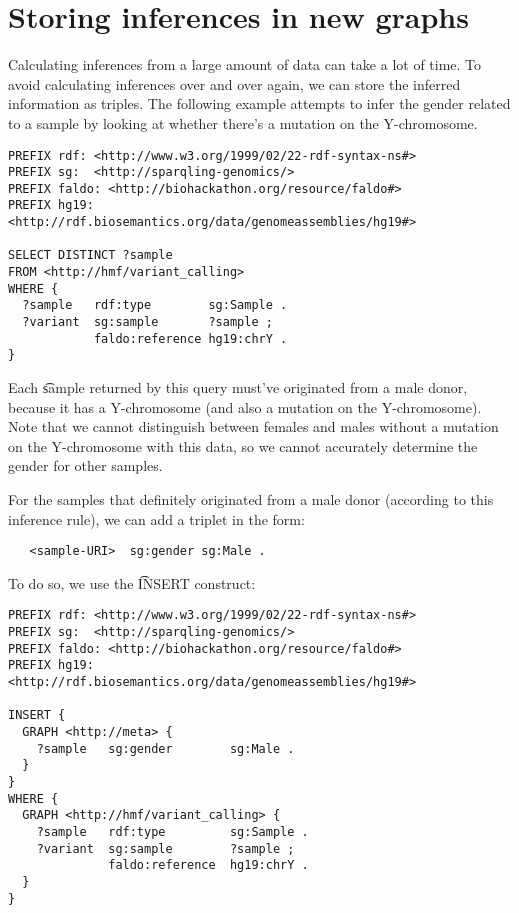 \section{Storing inferences in new graphs}
\label{sec:storing-inferences-in-new-graphs}

  Calculating inferences from a large amount of data can take a lot of time.
  To avoid calculating inferences over and over again, we can store the
  inferred information as triples.  The following example attempts to infer
  the gender related to a sample by looking at whether there's a mutation on
  the Y-chromosome.

\begin{siderules}
\begin{verbatim}
PREFIX rdf: <http://www.w3.org/1999/02/22-rdf-syntax-ns#>
PREFIX sg:  <http://sparqling-genomics/>
PREFIX faldo: <http://biohackathon.org/resource/faldo#>
PREFIX hg19:  <http://rdf.biosemantics.org/data/genomeassemblies/hg19#>

SELECT DISTINCT ?sample
FROM <http://hmf/variant_calling>
WHERE {
  ?sample   rdf:type        sg:Sample .
  ?variant  sg:sample       ?sample ;
            faldo:reference hg19:chrY .
}
\end{verbatim}
\end{siderules}

 Each \t{sample} returned by this query must've originated from a male
 donor, because it has a Y-chromosome (and also a mutation on the
 Y-chromosome).  Note that we cannot distinguish between females and males
 without a mutation on the Y-chromosome with this data, so we cannot accurately
 determine the gender for other samples.

 For the samples that definitely originated from a male donor (according to
 this inference rule), we can add a triplet in the form:

\begin{siderules}
\begin{verbatim}
   <sample-URI>  sg:gender sg:Male .
\end{verbatim}
\end{siderules}

  To do so, we use the \t{INSERT} construct:

\begin{siderules}
\begin{verbatim}
PREFIX rdf: <http://www.w3.org/1999/02/22-rdf-syntax-ns#>
PREFIX sg:  <http://sparqling-genomics/>
PREFIX faldo: <http://biohackathon.org/resource/faldo#>
PREFIX hg19:  <http://rdf.biosemantics.org/data/genomeassemblies/hg19#>

INSERT {
  GRAPH <http://meta> {
    ?sample   sg:gender        sg:Male .
  }
}
WHERE {
  GRAPH <http://hmf/variant_calling> {
    ?sample   rdf:type         sg:Sample .
    ?variant  sg:sample        ?sample ;
              faldo:reference  hg19:chrY .
  }
}
\end{verbatim}
\end{siderules}


